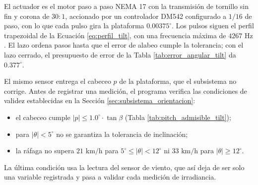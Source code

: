 \documentclass[../../General.tex]{subfiles}
\begin{document}
El actuador es el motor paso a paso NEMA 17 con la transmisión de tornillo sin fin y corona de $30:1$, accionado por un controlador DM542 configurado a $1/16$ de paso, con lo que cada pulso gira la plataforma $0.00375^\circ$. Los pulsos siguen el perfil trapezoidal de la Ecuación \ref{eq:perfil_tilt}, con una frecuencia máxima de $4267\text{ Hz}$. El lazo ordena pasos hasta que el error de alabeo cumple la tolerancia; con el lazo cerrado, el presupuesto de error de la Tabla \ref{tab:error_angular_tilt} da $0.377^\circ$.

El mismo sensor entrega el cabeceo $p$ de la plataforma, que el subsistema no corrige. Antes de registrar una medición, el programa verifica las condiciones de validez establecidas en la Sección \ref{sec:subsistema_orientacion}:
\begin{itemize}
    \item el cabeceo cumple $|p| \leq 1.0^\circ \cdot \tan\beta$ (Tabla \ref{tab:pitch_admisible_tilt});
    \item para $|\theta| < 5^\circ$ no se garantiza la tolerancia de inclinación;
    \item la ráfaga no supera $21\text{ km/h}$ para $5^\circ \leq |\theta| < 12^\circ$ ni $33\text{ km/h}$ para $|\theta| \geq 12^\circ$.
\end{itemize}
La última condición usa la lectura del sensor de viento, que así deja de ser solo una variable registrada y pasa a validar cada medición de irradiancia.
\end{document}

